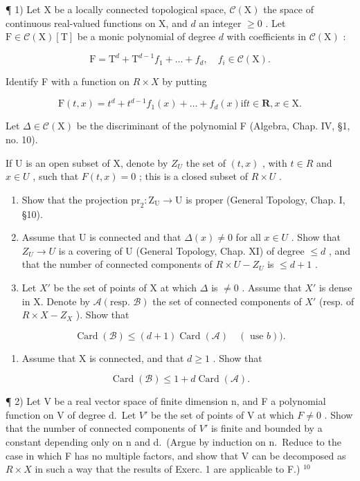 
¶ 1) Let X be a locally connected topological space, \(\mathcal{C}(\mathrm{X})\) the space of continuous real-valued functions on X, and \(d\) an integer \(\geq 0\) . Let \(\mathrm{F} \in \mathcal{C}(\mathrm{X})[\mathrm{T}]\) be a monic polynomial of degree \(d\) with coefficients in \(\mathcal{C}(\mathrm{X})\) :

\[
\mathrm{F} = \mathrm{T} ^ {d} + \mathrm{T} ^ {d - 1} f _ {1} + \dots + f _ {d}, \quad f _ {i} \in \mathcal {C} (\mathrm{X}).
\]

Identify F with a function on \(R \times X\) by putting

\[
\mathrm{F} (t, x) = t ^ {d} + t ^ {d - 1} f _ {1} (x) + \dots + f _ {d} (x) \text {if} t \in \mathbf {R}, x \in \mathrm{X}.
\]

Let \(\Delta \in \mathcal{C}(\mathrm{X})\) be the discriminant of the polynomial F (Algebra, Chap. IV, §1, no. 10).

If U is an open subset of X, denote by \(Z_{U}\) the set of \((t,x)\) , with \(t \in R\) and \(x \in U\) , such that \(F(t,x) = 0\) ; this is a closed subset of \(R \times U\) .

\begin{enumerate}
\def\labelenumi{\alph{enumi})}
\item
  Show that the projection \(\mathrm{pr}_2: \mathrm{Z}_{\mathrm{U}} \to \mathrm{U}\) is proper (General Topology, Chap. I, §10).
\item
  Assume that U is connected and that \(\Delta(x) \neq 0\) for all \(x \in U\) . Show that \(Z_{U} \to U\) is a covering of U (General Topology, Chap. XI) of degree \(\leq d\) , and that the number of connected components of \(R \times U - Z_{U}\) is \(\leq d + 1\) .
\item
  Let \(X'\) be the set of points of X at which \(\Delta\) is \(\neq 0\) . Assume that \(X'\) is dense in X. Denote by \(\mathcal{A}(\text{resp. } \mathcal{B})\) the set of connected components of \(X'\) (resp. of \(R \times X - Z_{X}\) ). Show that
\end{enumerate}

\[
\operatorname{Card} (\mathscr {B}) \leq (d + 1) \operatorname{Card} (\mathscr {A}) \quad (\text { use   } b)).
\]

\begin{enumerate}
\def\labelenumi{\alph{enumi})}
\setcounter{enumi}{3}
\tightlist
\item
  Assume that X is connected, and that \(d \geq 1\) . Show that
\end{enumerate}

\[
\operatorname{Card} (\mathcal {B}) \leq 1 + d \operatorname{Card} (\mathcal {A}).
\]

¶ 2) Let V be a real vector space of finite dimension n, and F a polynomial function on V of degree d.~Let \(V'\) be the set of points of V at which \(F \neq 0\) . Show that the number of connected components of \(V'\) is finite and bounded by a constant depending only on n and d.~(Argue by induction on n.~Reduce to the case in which F has no multiple factors, and show that V can be decomposed as \(R \times X\) in such a way that the results of Exerc. 1 are applicable to F.) \(^{10}\)

